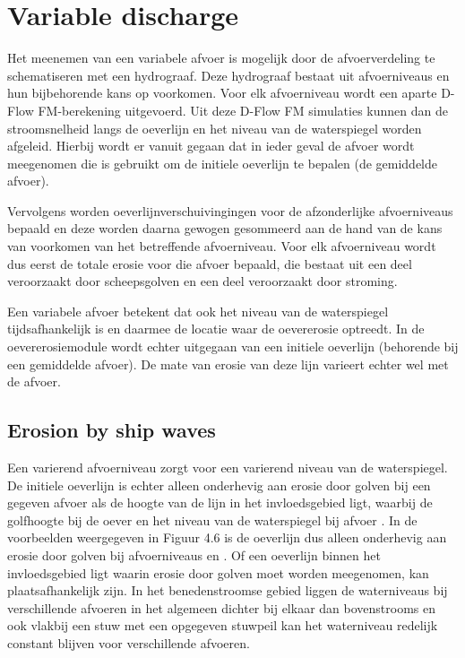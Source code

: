 \section{Variable discharge}

Het meenemen van een variabele afvoer is mogelijk door de afvoerverdeling te schematiseren met een hydrograaf.
Deze hydrograaf bestaat uit   afvoerniveaus en hun bijbehorende kans op voorkomen.
Voor elk afvoerniveau wordt een aparte D-Flow FM-berekening uitgevoerd.
Uit deze D-Flow FM simulaties kunnen dan de stroomsnelheid langs de oeverlijn en het niveau van de waterspiegel worden afgeleid.
Hierbij wordt er vanuit gegaan dat in ieder geval de afvoer wordt meegenomen die is gebruikt om de initiele oeverlijn te bepalen (de gemiddelde afvoer).

Vervolgens worden oeverlijnverschuivingingen voor de afzonderlijke afvoerniveaus bepaald en deze worden daarna gewogen gesommeerd aan de hand van de kans van voorkomen van het betreffende afvoerniveau.
Voor elk afvoerniveau   wordt dus eerst de totale erosie   voor die afvoer bepaald, die bestaat uit een deel veroorzaakt door scheepsgolven en een deel veroorzaakt door stroming.

Een variabele afvoer betekent dat ook het niveau van de waterspiegel tijdsafhankelijk is en daarmee de locatie waar de oevererosie optreedt.
In de oevererosiemodule wordt echter uitgegaan van een initiele oeverlijn (behorende bij een gemiddelde afvoer).
De mate van erosie van deze lijn varieert echter wel met de afvoer.


\subsection{Erosion by ship waves}

Een varierend afvoerniveau zorgt voor een varierend niveau van de waterspiegel.
De initiele oeverlijn is echter alleen onderhevig aan erosie door golven bij een gegeven afvoer   als de hoogte van de lijn in het invloedsgebied   ligt, waarbij   de golfhoogte bij de oever en   het niveau van de waterspiegel bij afvoer  .
In de voorbeelden weergegeven in Figuur 4.6 is de oeverlijn dus alleen onderhevig aan erosie door golven bij afvoerniveaus   en  .
Of een oeverlijn binnen het invloedsgebied ligt waarin erosie door golven moet worden meegenomen, kan plaatsafhankelijk zijn.
In het benedenstroomse gebied liggen de waterniveaus bij verschillende afvoeren in het algemeen dichter bij elkaar dan bovenstrooms en ook vlakbij een stuw met een opgegeven stuwpeil kan het waterniveau redelijk constant blijven voor verschillende afvoeren.


